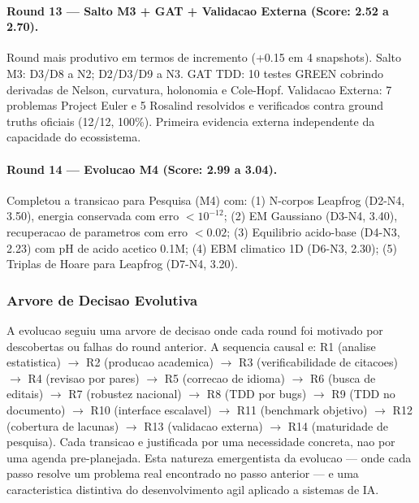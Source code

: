 \paragraph{Round 13 --- Salto M3 + GAT + Validacao Externa (Score: 2.52 a 2.70).}

Round mais produtivo em termos de incremento (+0.15 em 4 snapshots).
Salto M3: D3/D8 a N2; D2/D3/D9 a N3. GAT TDD: 10 testes GREEN cobrindo
derivadas de Nelson, curvatura, holonomia e Cole-Hopf. Validacao Externa:
7 problemas Project Euler e 5 Rosalind resolvidos e verificados contra
ground truths oficiais (12/12, 100\%). Primeira evidencia externa
independente da capacidade do ecossistema.

\paragraph{Round 14 --- Evolucao M4 (Score: 2.99 a 3.04).}

Completou a transicao para Pesquisa (M4) com: (1) N-corpos Leapfrog
(D2-N4, 3.50), energia conservada com erro $<10^{-12}$; (2) EM
Gaussiano (D3-N4, 3.40), recuperacao de parametros com erro $<0.02$;
(3) Equilibrio acido-base (D4-N3, 2.23) com pH de acido acetico 0.1M;
(4) EBM climatico 1D (D6-N3, 2.30); (5) Triplas de Hoare para Leapfrog
(D7-N4, 3.20).

\subsubsection{Arvore de Decisao Evolutiva}

A evolucao seguiu uma arvore de decisao onde cada round foi motivado por
descobertas ou falhas do round anterior. A sequencia causal e:
R1 (analise estatistica) $\to$ R2 (producao academica) $\to$ R3
(verificabilidade de citacoes) $\to$ R4 (revisao por pares) $\to$ R5
(correcao de idioma) $\to$ R6 (busca de editais) $\to$ R7 (robustez
nacional) $\to$ R8 (TDD por bugs) $\to$ R9 (TDD no documento) $\to$
R10 (interface escalavel) $\to$ R11 (benchmark objetivo) $\to$ R12
(cobertura de lacunas) $\to$ R13 (validacao externa) $\to$ R14
(maturidade de pesquisa). Cada transicao e justificada por uma
necessidade concreta, nao por uma agenda pre-planejada. Esta natureza
emergentista da evolucao --- onde cada passo resolve um problema real
encontrado no passo anterior --- e uma caracteristica distintiva do
desenvolvimento agil aplicado a sistemas de IA.

